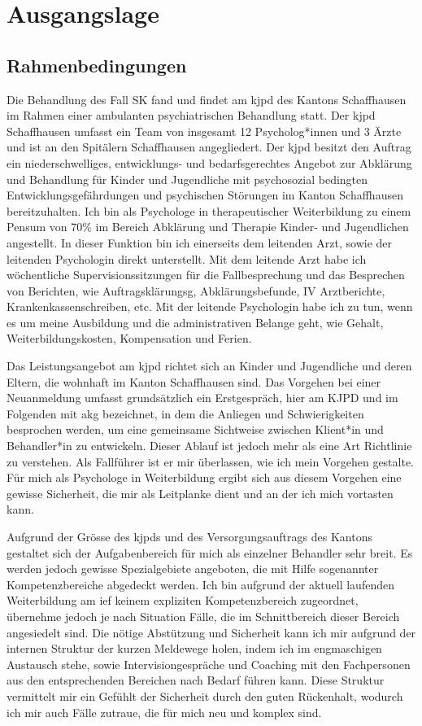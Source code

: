 \section{Ausgangslage} \label{Ausgangslage}
\subsection{Rahmenbedingungen}
Die Behandlung des Fall SK fand und findet am \ac{kjpd} des Kantons Schaffhausen im Rahmen einer ambulanten psychiatrischen Behandlung statt. Der \ac{kjpd} Schaffhausen umfasst ein Team von insgesamt 12 Psycholog*innen und 3 Ärzte und ist an den Spitälern Schaffhausen angegliedert. Der \ac{kjpd} besitzt den Auftrag ein niederschwelliges, entwicklungs- und bedarfsgerechtes Angebot zur Abklärung und Behandlung für Kinder und Jugendliche mit psychosozial bedingten Entwicklungsgefährdungen und psychischen Störungen im Kanton Schaffhausen bereitzuhalten. Ich bin als Psychologe in therapeutischer Weiterbildung zu einem Pensum von 70\% im Bereich Abklärung und Therapie Kinder- und Jugendlichen angestellt. In dieser Funktion bin ich einerseits dem leitenden Arzt, sowie der leitenden Psychologin direkt unterstellt. Mit dem leitende Arzt habe ich wöchentliche Supervisionssitzungen für die Fallbesprechung und das Besprechen von Berichten, wie Auftragsklärungsg,  Abklärungsbefunde, IV Arztberichte, Krankenkassenschreiben, etc. Mit der leitende Psychologin habe ich zu tun, wenn es um meine Ausbildung und die administrativen Belange geht, wie Gehalt, Weiterbildungskosten, Kompensation und Ferien. 

Das Leistungsangebot am \ac{kjpd} richtet sich an Kinder und Jugendliche und deren Eltern, die wohnhaft im Kanton Schaffhausen sind. Das Vorgehen bei einer Neuanmeldung umfasst grundsätzlich ein Erstgespräch, hier am KJPD und im Folgenden mit \ac{akg} bezeichnet, in dem die Anliegen und Schwierigkeiten besprochen werden, um eine gemeinsame Sichtweise zwischen Klient*in und Behandler*in zu entwickeln. Dieser Ablauf ist jedoch mehr als eine Art Richtlinie zu verstehen. Als Fallführer ist er mir überlassen, wie ich mein Vorgehen gestalte. Für mich als Psychologe in Weiterbildung ergibt sich aus diesem Vorgehen eine gewisse Sicherheit, die mir als Leitplanke dient und an der ich mich vortasten kann. 

Aufgrund der Grösse des \ac{kjpd}s und des Versorgungsauftrags des Kantons gestaltet sich der Aufgabenbereich für mich als einzelner Behandler sehr breit. Es werden jedoch gewisse Spezialgebiete angeboten, die mit Hilfe sogenannter Kompetenzbereiche abgedeckt werden. Ich bin aufgrund der aktuell laufenden Weiterbildung am \ac{ief} keinem expliziten Kompetenzbereich zugeordnet, übernehme jedoch je nach Situation Fälle, die im Schnittbereich dieser Bereich angesiedelt sind. Die nötige Abstützung und Sicherheit kann ich mir aufgrund der internen Struktur der kurzen Meldewege holen, indem ich im engmaschigen Austausch stehe, sowie Intervisiongespräche und Coaching mit den Fachpersonen aus den entsprechenden Bereichen nach Bedarf führen kann. Diese Struktur vermittelt mir ein Gefühlt der Sicherheit durch den guten Rückenhalt, wodurch ich mir auch Fälle zutraue, die für mich neu und komplex sind. 

